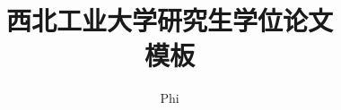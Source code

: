 \classno{***}
\secretlevel{}
\title[ Northwestern Polytechnical University graduate thesis template ]{	西北工业大学研究生学位论文\\模板}
\author[Phi]{Phi}
\SVBfalse%
{}

\makecover